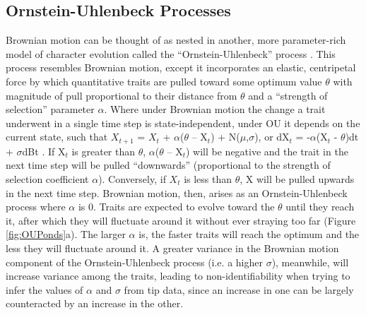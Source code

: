 \subsection{Ornstein-Uhlenbeck Processes}

Brownian motion can be thought of as nested in another, more parameter-rich model of character evolution called the ``Ornstein-Uhlenbeck'' process \citep[OU]{butlerPhylogeneticComparativeAnalysis2004, beaulieuModelingStabilizingSelection2012}. This process resembles Brownian motion, except it incorporates an elastic, centripetal force by which quantitative traits are pulled toward some optimum value $\theta$ with magnitude of pull proportional to their distance from $\theta$ and a “strength of selection” parameter $\alpha$. Where under Brownian motion  the change a trait underwent in a single time step is state-independent, under OU it depends on the current state, such that $X_{t+1}$ = $X_t$ + $\alpha$($\theta$ – X$_t$) + N($\mu$,$\sigma$), or dX$_t$ = -$\alpha$(X$_t$ - $\theta$)dt + $\sigma$dBt \citep{hansenStabilizingSelectionComparative1997}. If X$_t$ is greater than $\theta$, $\alpha$($\theta$ – X$_t$) will be negative and the trait in the next time step will be pulled “downwards” (proportional to the strength of selection coefficient $\alpha$). Conversely, if $X_t$ is less than $\theta$, X will be pulled upwards in the next time step. Brownian motion, then, arises as an Ornstein-Uhlenbeck process where $\alpha$ is 0. Traits are expected to evolve toward the $\theta$ until they reach it, after which they will fluctuate around it without ever straying too far (Figure \ref{fig:OUPonds}a). The larger $\alpha$ is, the faster traits will reach the optimum and the less they will fluctuate around it. A greater variance in the Brownian motion component of the Ornstein-Uhlenbeck process (i.e. a higher $\sigma$), meanwhile, will increase variance among the traits, leading to non-identifiability when trying to infer the values of $\alpha$ and $\sigma$ from tip data, since an increase in one can be largely counteracted by an increase in the other. 
 
